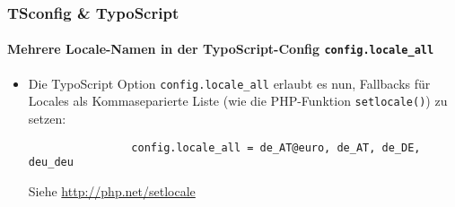 \begin{frame}[fragile]
	\frametitle{TSconfig \& TypoScript}
	\framesubtitle{Mehrere Locale-Namen in der TypoScript-Config \texttt{config.locale\_all}}

	\lstset{basicstyle=\small\ttfamily}

	\begin{itemize}

		\item Die TypoScript Option \texttt{config.locale\_all} erlaubt es nun, Fallbacks für Locales als Kommaseparierte Liste	(wie die PHP-Funktion \texttt{setlocale()}) zu setzen:

			\begin{lstlisting}
				config.locale_all = de_AT@euro, de_AT, de_DE, deu_deu
			\end{lstlisting}

			Siehe \url{http://php.net/setlocale}

	\end{itemize}

\end{frame}

